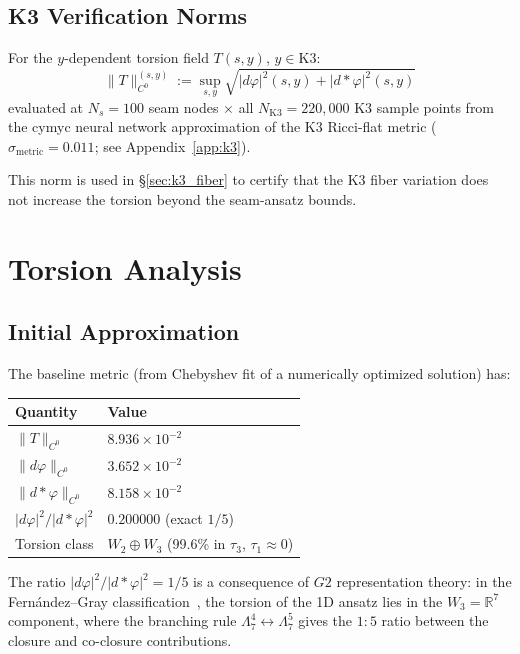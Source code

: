 \documentclass[11pt,a4paper]{article}
\newcommand{\Gtwo}{\mathrm{G}_2}
\newcommand{\norm}[1]{\|#1\|}
\theoremstyle{remark}
\def\Gtwo{G2}%
\begin{document}
\subsection{K3 Verification Norms}\label{sec:k3_norms}

For the $y$-dependent torsion field $T(s, y)$, $y \in \mathrm{K3}$:
\begin{equation}\label{eq:k3_norm}
\norm{T}_{C^0}^{(s,y)} := \sup_{s,y} \sqrt{|d\varphi|^2(s,y) + |d{*}\varphi|^2(s,y)}
\end{equation}
evaluated at $N_s = 100$ seam nodes $\times$ all $N_{\mathrm{K3}} = 220{,}000$ K3 sample points from the
cymyc neural network approximation of the K3 Ricci-flat metric ($\sigma_{\mathrm{metric}} = 0.011$;
see Appendix~\ref{app:k3}).

This norm is used in \S\ref{sec:k3_fiber} to certify that the K3 fiber variation does not increase
the torsion beyond the seam-ansatz bounds.

\section{Torsion Analysis}\label{sec:torsion}

\subsection{Initial Approximation}\label{sec:initial_torsion}

The baseline metric (from Chebyshev fit of a numerically optimized solution) has:

\begin{table}[H]
\centering
\begin{tabular}{ll}
\toprule
\textbf{Quantity} & \textbf{Value} \\
\midrule
$\norm{T}_{C^0}$ & $8.936 \times 10^{-2}$ \\
$\norm{d\varphi}_{C^0}$ & $3.652 \times 10^{-2}$ \\
$\norm{d{*}\varphi}_{C^0}$ & $8.158 \times 10^{-2}$ \\
$|d\varphi|^2 / |d{*}\varphi|^2$ & $0.200000$ (exact $1/5$) \\
Torsion class & $W_2 \oplus W_3$ (99.6\% in $\tau_3$, $\tau_1 \approx 0$) \\
\bottomrule
\end{tabular}
\end{table}

The ratio $|d\varphi|^2/|d{*}\varphi|^2 = 1/5$ is a consequence of $\Gtwo$ representation theory: in the
Fern\'andez--Gray classification~\cite{fernandez1982}, the torsion of the 1D ansatz lies in the
$W_3 = \mathbb{R}^7$ component, where the branching rule $\Lambda^4_7 \leftrightarrow \Lambda^5_7$ gives the $1{:}5$ ratio
between the closure and co-closure contributions.
\end{document}
